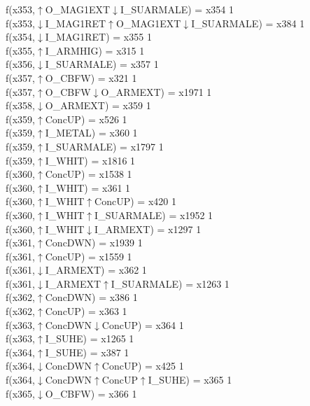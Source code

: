 f(x353,$\uparrow$O\_MAG1EXT$\downarrow$I\_SUARMALE) = x354 {1} \\
f(x353,$\downarrow$I\_MAG1RET$\uparrow$O\_MAG1EXT$\downarrow$I\_SUARMALE) = x384 {1} \\
f(x354,$\downarrow$I\_MAG1RET) = x355 {1} \\
f(x355,$\uparrow$I\_ARMHIG) = x315 {1} \\
f(x356,$\downarrow$I\_SUARMALE) = x357 {1} \\
f(x357,$\uparrow$O\_CBFW) = x321 {1} \\
f(x357,$\uparrow$O\_CBFW$\downarrow$O\_ARMEXT) = x1971 {1} \\
f(x358,$\downarrow$O\_ARMEXT) = x359 {1} \\
f(x359,$\uparrow$ConcUP) = x526 {1} \\
f(x359,$\uparrow$I\_METAL) = x360 {1} \\
f(x359,$\uparrow$I\_SUARMALE) = x1797 {1} \\
f(x359,$\uparrow$I\_WHIT) = x1816 {1} \\
f(x360,$\uparrow$ConcUP) = x1538 {1} \\
f(x360,$\uparrow$I\_WHIT) = x361 {1} \\
f(x360,$\uparrow$I\_WHIT$\uparrow$ConcUP) = x420 {1} \\
f(x360,$\uparrow$I\_WHIT$\uparrow$I\_SUARMALE) = x1952 {1} \\
f(x360,$\uparrow$I\_WHIT$\downarrow$I\_ARMEXT) = x1297 {1} \\
f(x361,$\uparrow$ConcDWN) = x1939 {1} \\
f(x361,$\uparrow$ConcUP) = x1559 {1} \\
f(x361,$\downarrow$I\_ARMEXT) = x362 {1} \\
f(x361,$\downarrow$I\_ARMEXT$\uparrow$I\_SUARMALE) = x1263 {1} \\
f(x362,$\uparrow$ConcDWN) = x386 {1} \\
f(x362,$\uparrow$ConcUP) = x363 {1} \\
f(x363,$\uparrow$ConcDWN$\downarrow$ConcUP) = x364 {1} \\
f(x363,$\uparrow$I\_SUHE) = x1265 {1} \\
f(x364,$\uparrow$I\_SUHE) = x387 {1} \\
f(x364,$\downarrow$ConcDWN$\uparrow$ConcUP) = x425 {1} \\
f(x364,$\downarrow$ConcDWN$\uparrow$ConcUP$\uparrow$I\_SUHE) = x365 {1} \\
f(x365,$\downarrow$O\_CBFW) = x366 {1} \\
